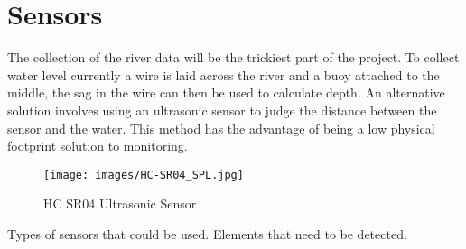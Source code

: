 \section{Sensors}

The collection of the river data will be the trickiest part of the project. To collect water level currently a wire is laid across the river and a buoy attached to the middle, the sag in the wire can then be used to calculate depth. \citep{SEPA2016} An alternative solution involves using an ultrasonic sensor to judge the distance between the sensor and the water. \citep{AravindJayan2016} This method has the advantage of being a low physical footprint solution to monitoring. 

\begin{figure}[H]
	\centering
	\texttt{[image: images/HC-SR04\_SPL.jpg]}\\
	\caption{ HC SR04 Ultrasonic Sensor \citep{MouserElectronics}}
	\label{fig:hcsr04}
\end{figure}



Types of sensors that could be used. Elements that need to be detected. 